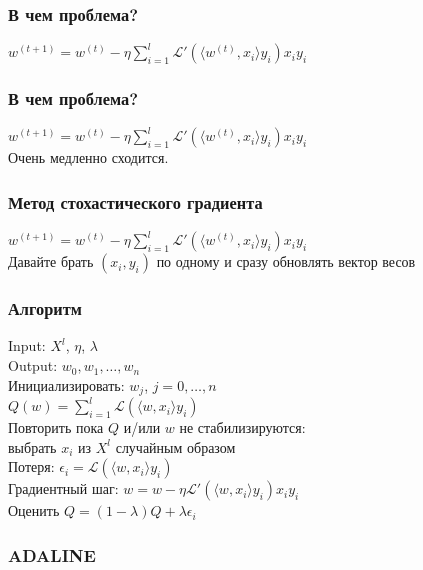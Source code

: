 \documentclass[12pt]{beamer}
\begin{document}
\begin{frame}\frametitle{В чем проблема?}
$w^{(t+1)} =  w^{(t)} - \eta \sum_{i=1}^l \mathcal{L}'(\langle w^{(t)}, x_i\rangle y_i)x_iy_i$\\
\end{frame}

\begin{frame}\frametitle{В чем проблема?}
$w^{(t+1)} =  w^{(t)} - \eta \sum_{i=1}^l \mathcal{L}'(\langle w^{(t)}, x_i\rangle y_i)x_iy_i$\\
\vspace{5mm}
Очень медленно сходится.
\end{frame}

\begin{frame}\frametitle{Метод стохастического градиента}
$w^{(t+1)} =  w^{(t)} - \eta \sum_{i=1}^l \mathcal{L}'(\langle w^{(t)}, x_i\rangle y_i)x_iy_i$\\
\vspace{5mm}
Давайте брать $(x_i, y_i)$ по одному и сразу обновлять вектор весов
\end{frame}


\begin{frame}\frametitle{Алгоритм}
Input: $X^l$, $\eta$, $\lambda$\\
Output: $w_0, w_1, \dots, w_n$\\
\vspace{3mm}
Инициализировать: $w_j$, $j=0,\dots, n$\\
\hspace{35mm} ${Q}(w) = \sum_{i=1}^l \mathcal{L}(\langle w, x_i \rangle y_i)$\\
Повторить пока $Q$ и/или $w$ не стабилизируются:\\
\hspace{5mm} выбрать $x_i$ из $X^l$ случайным образом\\
\hspace{5mm} Потеря: $\epsilon_i = \mathcal{L}(\langle w, x_i \rangle y_i)$\\
\hspace{5mm} Градиентный шаг: $w =  w - \eta \mathcal{L}'(\langle w, x_i\rangle y_i)x_iy_i$\\
\hspace{5mm} Оценить $Q = (1-\lambda)Q + \lambda \epsilon_i$
\end{frame}

\begin{frame}\frametitle{ADALINE}

\end{frame}
\end{document}
